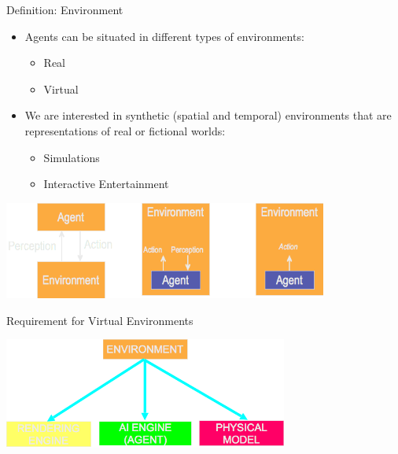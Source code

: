 \documentclass[aspectratio=1610,xcolor=dvipsnames,t]{beamer}
\begin{document}
\begin{frame}{Definition: Environment}
    \begin{itemize}
        \item Agents can be situated in different types
              of environments:
              \begin{itemize}
                    \item Real
                    \item Virtual
              \end{itemize}
        \item We are interested in synthetic (spatial and temporal)
              environments that are representations of real
              or fictional worlds:
                \begin{itemize}
                    \item Simulations
                    \item Interactive Entertainment
                \end{itemize}
    \end{itemize}
    \begin{center}
        \includegraphics[width=0.8\textwidth]{environments} 
    \end{center}
\end{frame} 

\begin{frame}{Requirement for Virtual Environments} 
    \begin{center}
        \includegraphics[width=0.7\textwidth]{envs} 
    \end{center}
\end{frame} 
\end{document}
